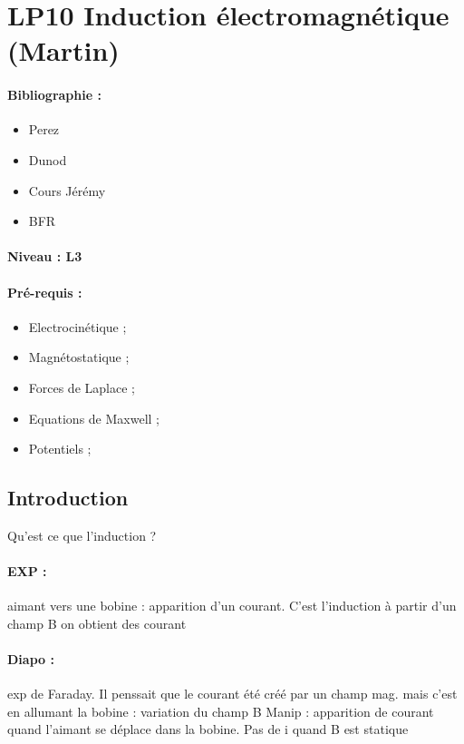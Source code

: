 \section{LP10 Induction électromagnétique (Martin)}

\paragraph{Bibliographie :}
\begin{itemize}
\item Perez
\item Dunod
\item Cours Jérémy
\item BFR
\end{itemize}

\paragraph{Niveau : L3} 

\paragraph{Pré-requis :}
\begin{itemize}
\item Electrocinétique ;
\item Magnétostatique ;
\item Forces de Laplace ;
\item Equations de Maxwell ;
\item Potentiels ;
\end{itemize}

\subsection{Introduction}

Qu'est ce que l'induction ?
\paragraph{EXP : } aimant vers une bobine : apparition d'un courant.
C'est l'induction à partir d'un champ B on obtient des courant

\paragraph{Diapo :} exp de Faraday. Il penssait que le courant été créé par un champ mag. mais c'est en allumant la bobine : variation du champ B
Manip : apparition de courant quand l'aimant se déplace dans la bobine.
Pas de i quand B est statique

